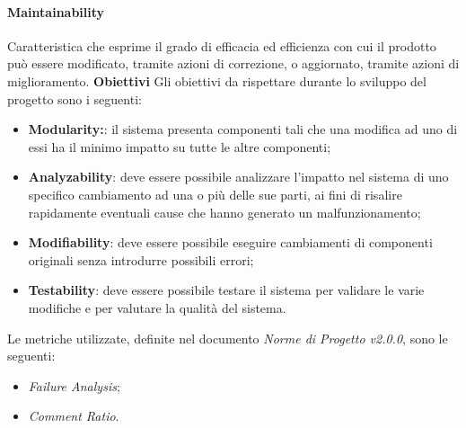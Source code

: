 \paragraph{Maintainability} \Spazio
	Caratteristica che esprime il grado di efficacia ed efficienza con cui il prodotto può essere modificato, tramite azioni di correzione, o aggiornato, tramite azioni di miglioramento. \Spazio
	\textbf{Obiettivi} \Spazio
	Gli obiettivi da rispettare durante lo sviluppo del progetto sono i seguenti:
	\begin{itemize}
		\item{\textbf{Modularity:}: il sistema presenta componenti tali che una modifica ad uno di essi ha il minimo impatto su tutte le altre componenti;
		}
		\item{\textbf{Analyzability}: deve essere possibile analizzare l'impatto nel sistema di uno specifico cambiamento ad una o più delle sue parti, ai fini
		di risalire rapidamente eventuali cause che hanno generato un malfunzionamento;
 		}
		\item{\textbf{Modifiability}: deve essere possibile eseguire cambiamenti di componenti originali senza introdurre possibili errori;
		}
		\item{\textbf{Testability}: deve essere possibile testare il sistema per validare le varie modifiche e per valutare la qualità del sistema.
		}
	\end{itemize}
	Le metriche utilizzate, definite nel documento \emph{Norme di Progetto v2.0.0}, sono le seguenti:
	\begin{itemize}
		\item{\emph{Failure Analysis};}
		\item{\emph{Comment Ratio}.}
	\end{itemize}

